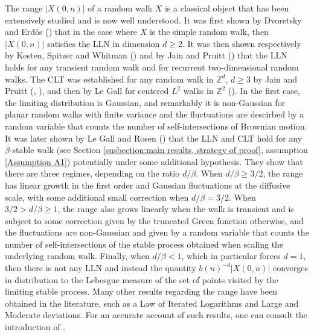 \documentclass[12pt]{article}
\newcommand{\1}{\mathds{1}}
\newcommand{\ZZ}{\mathbb Z}
\numberwithin{equation}{section}
\begin{document}
The range $|X(0,n)|$ of a random walk $X$ is a classical object that has been extensively studied and is now well understood. It was first shown by Dvoretsky and Erdös (\cite{DvoretzkyErdos1951}) that in the case where $X$ is the simple random walk, then $|X(0,n)|$ satisfies the LLN in dimension $d\ge2$. It was then shown respectively by Kesten, Spitzer and Whitman (\cite{Spitzer1965}) and by Jain and Pruitt (\cite{JainPruitt1972}) that the LLN holds for any transient random walk and for recurrent two-dimensional random walks. The CLT was established for any random walk in $\ZZ^d$, $d\ge3$ by Jain and Pruitt (\cite{JainPruitt1971}, \cite{JainPruitt1974}), and then by Le Gall for centered $L^2$ walks in $\ZZ^2$ (\cite{LeGallIntersectionsMarchesAléatoires1986}). In the first case, the limiting distribution is Gaussian, and remarkably it is non-Gaussian for planar random walks with finite variance and the fluctuations are descirbed by a random variable that counts the number of self-intersections of Brownian motion. It was later shown by Le Gall and Rosen (\cite{LeGallRosenRangeOfStableRandomWalks1991}) that the LLN and CLT hold for any $\beta$-stable walk (see Section \ref{susbection:main results, strategy of proof}, assumption \ref{Assumption A1}) potentially under some additional hypothesis. They show that there are three regimes, depending on the ratio $d/\beta$. When $d/\beta\ge3/2$, the range has linear growth in the first order and Gaussian fluctuations at the diffusive scale, with some additional small correction when $d/\beta=3/2$. When $3/2>d/\beta\ge1$, the range also grows linearly when the walk is transient and is subject to some correction given by the truncated Green function otherwise, and the fluctuations are non-Gaussian and given by a random variable that counts the number of self-intersections of the stable process obtained when scaling the underlying random walk. Finally, when $d/\beta<1$, which in particular forces $d=1$, then there is not any LLN and instead the quantity $b(n)^{-d}|X(0,n)|$ converges in distribution to the Lebesgue measure of the set of points visited by the limiting stable process. Many other results regarding the range have been obtained in the literature, such as a Law of Iterated Logarithms and Large and Moderate deviations. For an accurate account of such results, one can consult the introduction of \cite{BassChenRosenModerateDeviations2009}. 
\end{document}
